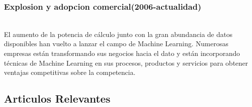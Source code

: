 \documentclass[a4paper,11pt]{article}
\begin{document}
	\subsubsection{Explosion y adopcion comercial(2006-actualidad)}\\
	El aumento de la potencia de cálculo junto con la gran abundancia
	de datos disponibles han vuelto a lanzar el campo de Machine Learning. Numerosas empresas están transformando sus negocios
	hacia el dato y están incorporando técnicas de Machine Learning en sus procesos, productos y servicios para obtener ventajas competitivas sobre la competencia.
	
	\subsection{Articulos Relevantes}\\
	
\end{document}
